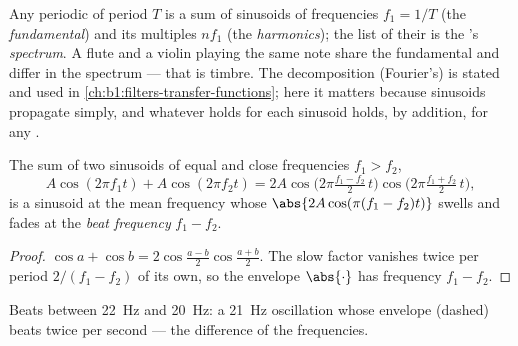 \begin{remark}[Spectrum]\label{rem:b1:wave-propagation:spectrum}
Any periodic  of period $T$ is a sum of sinusoids of frequencies
$f_1 = 1/T$ (the \emph{fundamental}) and its multiples $nf_1$ (the
\emph{harmonics}); the list of their  is the 's
\emph{spectrum}. A flute and a violin playing the same note share the
fundamental and differ in the spectrum --- that is timbre. The
decomposition (Fourier's) is stated and used in
\cref{ch:b1:filters-transfer-functions}; here it matters because
sinusoids propagate simply, and whatever holds for each sinusoid holds,
by addition, for any .
\end{remark}

\begin{proposition}[Beats]\label{prop:b1:wave-propagation:beats}
The sum of two sinusoids of equal  and close frequencies
$f_1 > f_2$,
\[
A\cos(2\pi f_1 t) + A\cos(2\pi f_2 t)
= 2A\cos\!\big(2\pi\tfrac{f_1 - f_2}{2}\,t\big)\cos\!\big(2\pi\tfrac{f_1 + f_2}{2}\,t\big),
\]
is a sinusoid at the mean frequency whose 
$\abs{2A\cos(\pi(f_1 - f_2)t)}$ swells and fades at the \emph{beat
frequency} $f_1 - f_2$.
\end{proposition}

\begin{proof}
$\cos a + \cos b = 2\cos\frac{a - b}{2}\cos\frac{a + b}{2}$. The slow
factor vanishes twice per period $2/(f_1 - f_2)$ of its own, so the
envelope $\abs{\cdot}$ has frequency $f_1 - f_2$.
\end{proof}

\begin{omfigure}

{\small Beats between \qty{22}{Hz} and \qty{20}{Hz}: a \qty{21}{Hz}
oscillation whose envelope (dashed) beats twice per second --- the
difference of the frequencies.}
\end{omfigure}

